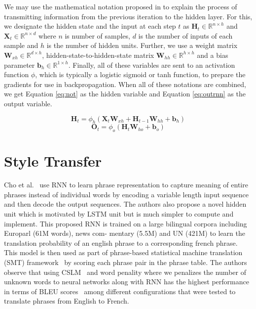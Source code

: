 \documentclass[akbc,twoside,11pt]{article}
\begin{document}
We may use the mathematical notation proposed in \cite{zhang2019dive} to explain the process of transmitting information from the previous iteration to the hidden layer. For this, we designate the hidden state and the input at each step $t$ as $\mathbf{H}_{t} \in \mathbb{R}^{n \times h}$ and $\mathbf{X}_t \in \mathbb{R}^{n \times d}$ where $n$ is number of samples, $d$ is the number of inputs of each sample and $h$ is the number of hidden units. Further, we use a weight matrix $\mathbf{W}_{x h} \in \mathbb{R}^{d \times h}$, hidden-state-to-hidden-state matrix $\mathbf{W}_{h h} \in \mathbb{R}^{h \times h}$ and a bias parameter $\mathbf{b}_{h} \in \mathbb{R}^{1 \times h}$. Finally, all of these variables are sent to an activation function $\phi$, which is typically a logistic sigmoid or tanh function, to prepare the gradients for use in backpropagation. When all of these notations are combined, we get Equation \ref{eq:not} as the hidden variable and Equation \ref{eq:outrnn} as the output variable.

\begin{equation}
\label{eq:not}
    \mathbf{H}_{t}=\phi_h\left(\mathbf{X}_{t} \mathbf{W}_{x h}+\mathbf{H}_{t-1} \mathbf{W}_{h h}+\mathbf{b}_{h}\right)
\end{equation}
\begin{equation}
\label{eq:outrnn}
    \mathbf{O}_{t}=\phi_o\left(\mathbf{H}_{t} \mathbf{W}_{h o}+\mathbf{b}_{o}\right)
\end{equation}

\section{Style Transfer}
\label{sec:style_transfer}

Cho et al.~\cite{cho2014learning} use RNN to learn phrase representation to capture meaning of entire phrases instead of individual words by encoding a variable length input sequence and then decode the output sequences. The authors also propose a novel hidden unit which is motivated by LSTM unit but is much simpler to compute and implement. This proposed RNN is trained on a large bilingual corpora including Europarl (61M words), news com- mentary (5.5M) and UN (421M) to learn the translation probability of an english phrase to a corresponding french phrase. This model is then used as part of phrase-based statistical machine translation (SMT) framework~\cite{koehn-2005-europarl,marcu-wong-2002-phrase} by scoring each phrase pair in the phrase table. The authors observe that using CSLM~\cite{SCHWENK2007492} and word penality where we penalizes the number of unknown words to neural networks along with RNN has the highest performance in terms of BLEU scores~\cite{papineni2002bleu} among different configurations that were tested to translate phrases from English to French.
\end{document}
